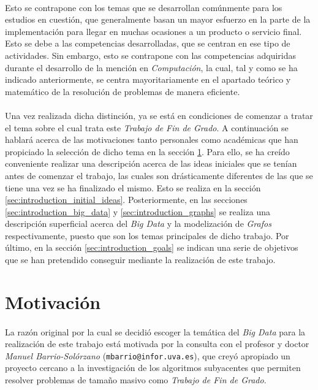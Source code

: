 \documentclass{subfiles}
\begin{document}
      \paragraph{}
      Esto se contrapone con los temas que se desarrollan comúnmente para los estudios en cuestión, que generalmente basan un mayor esfuerzo en la parte de la  implementación para llegar en muchas ocasiones a un producto o servicio final. Esto se debe a las competencias desarrolladas, que se centran en ese tipo de actividades. Sin embargo, esto se contrapone con las competencias adquiridas durante el desarrollo de la mención en \emph{Computación}, la cual, tal y como se ha indicado anteriormente, se centra mayoritariamente en el apartado teórico y matemático de la resolución de problemas de manera eficiente.

      \paragraph{}
      Una vez realizada dicha distinción, ya se está en condiciones de comenzar a tratar el tema sobre el cual trata este \emph{Trabajo de Fin de Grado}. A continuación se hablará acerca de las motivaciones tanto personales como académicas que han propiciado la selección de dicho tema en la sección \ref{sec:introduction_motivation}. Para ello, se ha creído conveniente realizar una descripción acerca de las ideas iniciales que se tenían antes de comenzar el trabajo, las cuales son drásticamente diferentes de las que se tiene una vez se ha finalizado el mismo. Esto se realiza en la sección \ref{sec:introduction_initial_ideas}. Posteriormente, en las secciones \ref{sec:introduction_big_data} y \ref{sec:introduction_graphs} se realiza una descripción superficial acerca del \emph{Big Data} y la modelización de \emph{Grafos} respectivamente, puesto que son los temas principales de dicho trabajo. Por último, en la sección \ref{sec:introduction_goals} se indican una serie de objetivos que se han pretendido conseguir mediante la realización de este trabajo.


    \section{Motivación}
    \label{sec:introduction_motivation}

      \paragraph{}
      La razón original por la cual se decidió escoger la temática del \emph{Big Data} para la realización de este trabajo está motivada por la consulta con el profesor y doctor \emph{Manuel Barrio-Solórzano} (\texttt{mbarrio@infor.uva.es}), que creyó apropiado un proyecto cercano a la investigación de los algoritmos subyacentes que permiten resolver problemas de tamaño masivo como \emph{Trabajo de Fin de Grado}.
\end{document}
